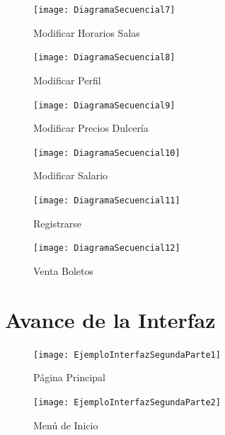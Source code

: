 \documentclass[12pt, fleqn]{report}                             %
\begin{document}
        \begin{figure}[ht]
            \centering
            \texttt{[image: DiagramaSecuencial7]}
            \caption{Modificar Horarios Salas}
        \end{figure}
        
        \begin{figure}[ht]
            \centering
            \texttt{[image: DiagramaSecuencial8]}
            \caption{Modificar Perfil}
        \end{figure}


        \begin{figure}[ht]
            \centering
            \texttt{[image: DiagramaSecuencial9]}
            \caption{Modificar Precios Dulcería}
        \end{figure}

        \begin{figure}[ht]
            \centering
            \texttt{[image: DiagramaSecuencial10]}
            \caption{Modificar Salario}
        \end{figure}


        \begin{figure}[ht]
            \centering
            \texttt{[image: DiagramaSecuencial11]}
            \caption{Registrarse}
        \end{figure}


        \begin{figure}[ht]
            \centering
            \texttt{[image: DiagramaSecuencial12]}
            \caption{Venta Boletos}
        \end{figure}


    \clearpage
    \section{Avance de la Interfaz}

        \begin{figure}[ht]
            \centering
            \texttt{[image: EjemploInterfazSegundaParte1]}
            \caption{Página Principal}
        \end{figure}


        \begin{figure}[ht]
            \centering
            \texttt{[image: EjemploInterfazSegundaParte2]}
            \caption{Menú de Inicio}
        \end{figure}
\end{document}
